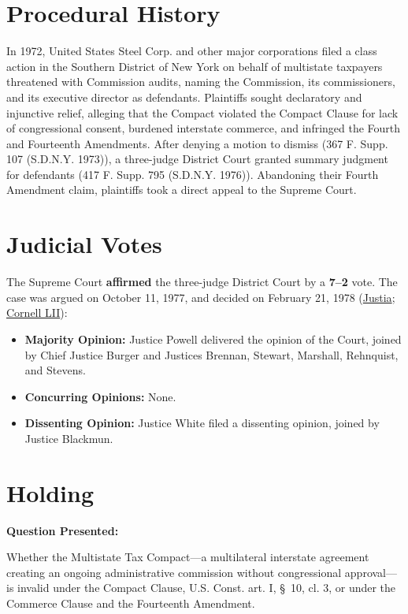 \documentclass[12pt]{article}
\begin{document}
\section{Procedural History}
In 1972, United States Steel Corp. and other major corporations filed a class action in the Southern District of New York on behalf of multistate taxpayers threatened with Commission audits, naming the Commission, its commissioners, and its executive director as defendants. Plaintiffs sought declaratory and injunctive relief, alleging that the Compact violated the Compact Clause for lack of congressional consent, burdened interstate commerce, and infringed the Fourth and Fourteenth Amendments. After denying a motion to dismiss (367 F. Supp. 107 (S.D.N.Y. 1973)), a three-judge District Court granted summary judgment for defendants (417 F. Supp. 795 (S.D.N.Y. 1976)). Abandoning their Fourth Amendment claim, plaintiffs took a direct appeal to the Supreme Court.

\section{Judicial Votes}
The Supreme Court \textbf{affirmed} the three-judge District Court by a \textbf{7--2} vote. The case was argued on October 11, 1977, and decided on February 21, 1978 (\href{https://supreme.justia.com/cases/federal/us/434/452/}{Justia}; \href{https://www.law.cornell.edu/supremecourt/text/434/452}{Cornell LII}):

\begin{itemize}
    \item \textbf{Majority Opinion:} Justice Powell delivered the opinion of the Court, joined by Chief Justice Burger and Justices Brennan, Stewart, Marshall, Rehnquist, and Stevens.
    \item \textbf{Concurring Opinions:} None.
    \item \textbf{Dissenting Opinion:} Justice White filed a dissenting opinion, joined by Justice Blackmun.
\end{itemize}

\section{Holding}
\textbf{Question Presented:}

Whether the Multistate Tax Compact---a multilateral interstate agreement creating an ongoing administrative commission without congressional approval---is invalid under the Compact Clause, U.S. Const. art. I, \S\ 10, cl. 3, or under the Commerce Clause and the Fourteenth Amendment.
\end{document}
